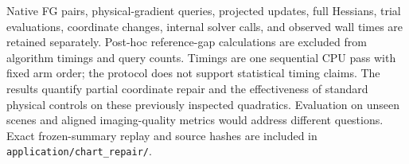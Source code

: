 Native FG pairs, physical-gradient queries, projected updates, full Hessians, trial evaluations, coordinate changes, internal solver calls, and observed wall times are retained separately. Post-hoc reference-gap calculations are excluded from algorithm timings and query counts. Timings are one sequential CPU pass with fixed arm order; the protocol does not support statistical timing claims. The results quantify partial coordinate repair and the effectiveness of standard physical controls on these previously inspected quadratics. Evaluation on unseen scenes and aligned imaging-quality metrics would address different questions. Exact frozen-summary replay and source hashes are included in \nolinkurl{application/chart_repair/}.
